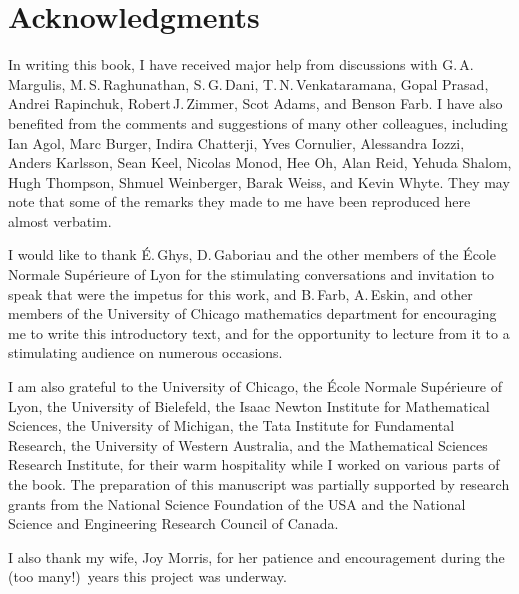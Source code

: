 




\begingroup
 \makeatletter \@openrightfalse %
 \makeatother
 
\putintocfalse %
\chapter*{Acknowledgments}

 In writing this book, I have received major help from discussions with
G.\,A.\,Margulis, 
M.\,S.\,Raghunathan, 
S.\,G.\,Dani, 
T.\,N.\,Venkataramana, 
Gopal Prasad, 
Andrei Rapinchuk,
Robert\,J.\,Zimmer,
Scot Adams, 
and 
Benson Farb.
I have also benefited from the comments
and suggestions of many other colleagues, including
 Ian Agol,
 Marc Burger,
 Indira Chatterji,
 Yves Cornulier,
 Alessandra Iozzi,
 Anders Karlsson,
 Sean Keel,
 Nicolas Monod,
 Hee Oh,
 Alan Reid,
 Yehuda Shalom,
 Hugh Thompson,
 Shmuel Weinberger,
 Barak Weiss,
 and 
 Kevin Whyte.
 They may note that some of the
remarks they made to me have been reproduced
here almost verbatim.

I would like to thank \'E.\,Ghys, D.\,Gaboriau and the other
members of the \'Ecole Normale Sup\'erieure of Lyon for the
stimulating conversations and invitation to speak that were
the impetus for this work, and B.\,Farb, A.\,Eskin, and other
members of the University of Chicago mathematics
department for encouraging me to write this introductory text,
and for the opportunity to lecture from it to a stimulating audience on numerous occasions.

I am also grateful to 
the University of Chicago, 
the \'Ecole Normale Sup\'erieure of Lyon, 
the University of Bielefeld, 
the Isaac Newton Institute for Mathematical Sciences, 
the University of Michigan, 
the Tata Institute for Fundamental Research,
the University of Western Australia,
and
the Mathematical Sciences Research Institute,
for their warm
hospitality while I worked on various parts of the book. 
The preparation of this manuscript was partially
supported by research grants from the National Science
Foundation of the USA and the National Science and Engineering
Research Council of Canada.

I also thank my wife, Joy Morris, for her patience and encouragement during the (too many!)\ years this project was underway.

\endgroup
